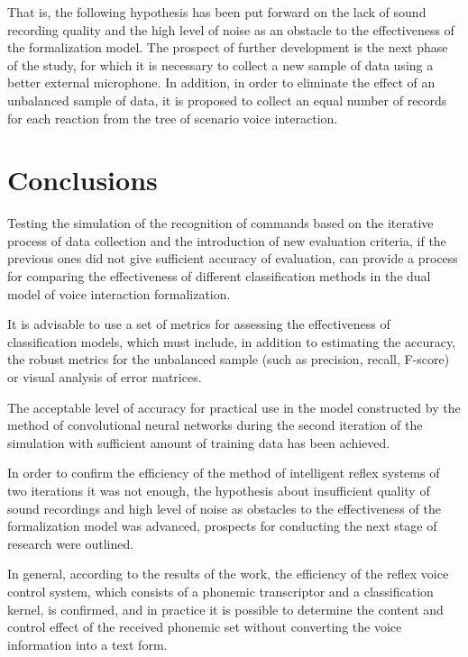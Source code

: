 That is, the following hypothesis has been put forward on the lack of sound recording quality and the high level of noise as an obstacle to the effectiveness of the formalization model. The prospect of further development is the next phase of the study, for which it is necessary to collect a new sample of data using a better external microphone. In addition, in order to eliminate the effect of an unbalanced sample of data, it is proposed to collect an equal number of records for each reaction from the tree of scenario voice interaction.

\section{Conclusions}

Testing the simulation of the recognition of commands based on the iterative process of data collection and the introduction of new evaluation criteria, if the previous ones did not give sufficient accuracy of evaluation, can provide a process for comparing the effectiveness of different classification methods in the dual model of voice interaction formalization.

It is advisable to use a set of metrics for assessing the effectiveness of classification models, which must include, in addition to estimating the accuracy, the robust metrics for the unbalanced sample (such as precision, recall, F-score) or visual analysis of error matrices.

The acceptable level of accuracy for practical use in the model constructed by the method of convolutional neural networks during the second iteration of the simulation with sufficient amount of training data has been achieved.

In order to confirm the efficiency of the method of intelligent reflex systems of two iterations it was not enough, the hypothesis about insufficient quality of sound recordings and high level of noise as obstacles to the effectiveness of the formalization model was advanced, prospects for conducting the next stage of research were outlined.

In general, according to the results of the work, the efficiency of the reflex voice control system, which consists of a phonemic transcriptor and a classification kernel, is confirmed, and in practice it is possible to determine the content and control effect of the received phonemic set without converting the voice information into a text form.


